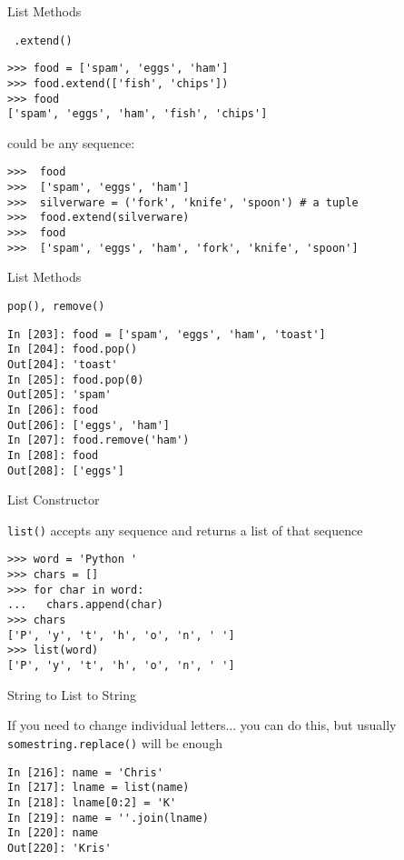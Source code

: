 \documentclass{beamer}
\begin{document}
\begin{frame}[fragile]{List Methods}

{\large \verb| .extend()|}

\begin{verbatim}
>>> food = ['spam', 'eggs', 'ham']
>>> food.extend(['fish', 'chips'])
>>> food
['spam', 'eggs', 'ham', 'fish', 'chips']
\end{verbatim}

{\large could be any sequence:}

\begin{verbatim}
>>>  food
>>>  ['spam', 'eggs', 'ham']
>>>  silverware = ('fork', 'knife', 'spoon') # a tuple
>>>  food.extend(silverware)
>>>  food
>>>  ['spam', 'eggs', 'ham', 'fork', 'knife', 'spoon']
\end{verbatim}

\end{frame} 

\begin{frame}[fragile]{List Methods}

{\large \verb|pop(), remove() |}

\begin{verbatim}
In [203]: food = ['spam', 'eggs', 'ham', 'toast']
In [204]: food.pop()
Out[204]: 'toast'
In [205]: food.pop(0)
Out[205]: 'spam'
In [206]: food
Out[206]: ['eggs', 'ham']
In [207]: food.remove('ham')
In [208]: food
Out[208]: ['eggs']
\end{verbatim}
\end{frame} 

\begin{frame}[fragile]{List Constructor}

{\large \verb|list()| accepts any sequence and returns a list of that sequence}
\begin{verbatim}
>>> word = 'Python '
>>> chars = []
>>> for char in word:
...   chars.append(char)
>>> chars
['P', 'y', 't', 'h', 'o', 'n', ' ']
>>> list(word)
['P', 'y', 't', 'h', 'o', 'n', ' ']
\end{verbatim}
\end{frame} 


\begin{frame}[fragile]{String to List to String}

{\large If you need to change individual letters... you can do this,
but usually \verb|somestring.replace()| will be enough }

\begin{verbatim}
In [216]: name = 'Chris'
In [217]: lname = list(name)
In [218]: lname[0:2] = 'K'
In [219]: name = ''.join(lname)
In [220]: name
Out[220]: 'Kris'
\end{verbatim}

\end{frame} 
\end{document}
